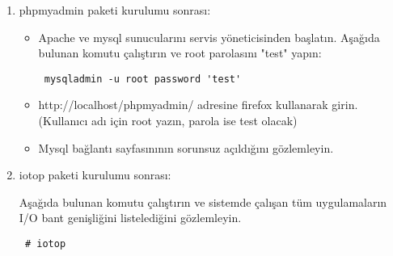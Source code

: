 \documentclass[a4paper,10pt]{article}
\begin{document}
\begin{enumerate}
 \item phpmyadmin paketi kurulumu sonrası:
\begin{itemize}
 \item Apache ve mysql sunucularını servis yöneticisinden başlatın. Aşağıda bulunan komutu çalıştırın ve root parolasını "test" yapın:
\begin{verbatim}
 mysqladmin -u root password 'test'
\end{verbatim}

 \item http://localhost/phpmyadmin/ adresine firefox kullanarak girin. (Kullanıcı adı için root yazın, parola ise test olacak)
 \item Mysql bağlantı sayfasınının sorunsuz açıldığını gözlemleyin.
\end{itemize}

 \item iotop paketi kurulumu sonrası:

Aşağıda bulunan komutu çalıştırın ve sistemde çalışan tüm uygulamaların I/O bant genişliğini listelediğini gözlemleyin.
\begin{verbatim}
 # iotop
\end{verbatim}

\end{enumerate}
\end{document}
